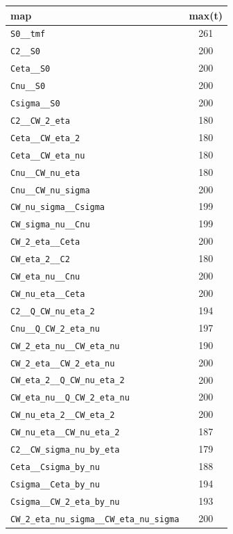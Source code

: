 \begin{table}\begin{tabular}{|l|c|}\hline
map & max(t)\\\hline
\texttt{S0\_\_tmf} & 261\\\hline
\texttt{C2\_\_S0} & 200\\\hline
\texttt{Ceta\_\_S0} & 200\\\hline
\texttt{Cnu\_\_S0} & 200\\\hline
\texttt{Csigma\_\_S0} & 200\\\hline
\texttt{C2\_\_CW\_2\_eta} & 180\\\hline
\texttt{Ceta\_\_CW\_eta\_2} & 180\\\hline
\texttt{Ceta\_\_CW\_eta\_nu} & 180\\\hline
\texttt{Cnu\_\_CW\_nu\_eta} & 180\\\hline
\texttt{Cnu\_\_CW\_nu\_sigma} & 200\\\hline
\texttt{CW\_nu\_sigma\_\_Csigma} & 199\\\hline
\texttt{CW\_sigma\_nu\_\_Cnu} & 199\\\hline
\texttt{CW\_2\_eta\_\_Ceta} & 200\\\hline
\texttt{CW\_eta\_2\_\_C2} & 180\\\hline
\texttt{CW\_eta\_nu\_\_Cnu} & 200\\\hline
\texttt{CW\_nu\_eta\_\_Ceta} & 200\\\hline
\texttt{C2\_\_Q\_CW\_nu\_eta\_2} & 194\\\hline
\texttt{Cnu\_\_Q\_CW\_2\_eta\_nu} & 197\\\hline
\texttt{CW\_2\_eta\_nu\_\_CW\_eta\_nu} & 190\\\hline
\texttt{CW\_2\_eta\_\_CW\_2\_eta\_nu} & 200\\\hline
\texttt{CW\_eta\_2\_\_Q\_CW\_nu\_eta\_2} & 200\\\hline
\texttt{CW\_eta\_nu\_\_Q\_CW\_2\_eta\_nu} & 200\\\hline
\texttt{CW\_nu\_eta\_2\_\_CW\_eta\_2} & 200\\\hline
\texttt{CW\_nu\_eta\_\_CW\_nu\_eta\_2} & 187\\\hline
\texttt{C2\_\_CW\_sigma\_nu\_by\_eta} & 179\\\hline
\texttt{Ceta\_\_Csigma\_by\_nu} & 188\\\hline
\texttt{Csigma\_\_Ceta\_by\_nu} & 194\\\hline
\texttt{Csigma\_\_CW\_2\_eta\_by\_nu} & 193\\\hline
\texttt{CW\_2\_eta\_nu\_sigma\_\_CW\_eta\_nu\_sigma} & 200\\\hline

\end{tabular}
\end{table}
